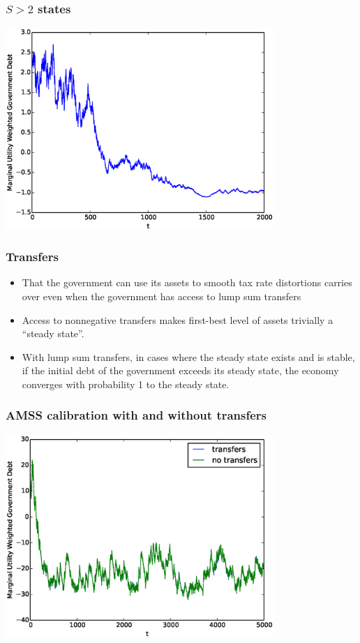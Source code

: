 \documentclass{beamer}
\begin{document}
\begin{frame}
	\frametitle{$S>2$ states}
	\begin{center}
	\includegraphics[width=4in]{Images/5stateiid.eps}
	\end{center}
\end{frame}



 \begin{frame}
  \frametitle{Transfers}
	\begin{itemize}
	\item  That the government can use its assets to smooth tax rate distortions carries over even when the government has access to lump sum transfers
	\item Access to nonnegative transfers makes first-best level of assets trivially a ``steady state''.    	
\item  With lump sum transfers,  in cases where the steady state exists and is stable, if the initial debt of the government exceeds its steady state,  the economy  converges with probability 1 to the steady state.
		
	\end{itemize}
 \end{frame}

 \begin{frame}
	\frametitle{AMSS calibration with and without transfers}
	\begin{center}
	\includegraphics[width=4in]{Images/transfer_example1.eps}
	\end{center}
\end{frame}
\end{document}
